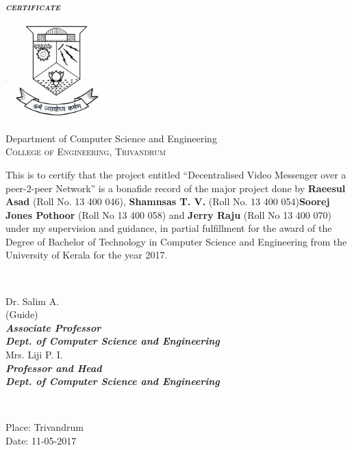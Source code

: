 \documentclass[a4paper,11pt]{article}
\begin{document}
	\begin{titlepage}
		\begin{centering}
			\textbf{\textit{\LARGE\textsc{{certificate}}}}\\
			\includegraphics[width=4cm]{images/logo.jpg}\\
                        Department of Computer Science and Engineering\\
		\textsc{College of Engineering, Trivandrum}\\[1.0cm]

		\end{centering}

		\large{This is to certify that the project entitled ``Decentralised Video Messenger over a peer-2-peer Network'' is a bonafide record of the major project done by \textbf{Raeesul Asad} (Roll No. 13 400 046), \textbf{Shamnsas T. V.} (Roll No. 13 400 054)\textbf{Soorej Jones Pothoor} (Roll No 13 400 058) and \textbf{Jerry Raju} (Roll No 13 400 070) under my supervision and guidance, in partial fulfillment for the award of the Degree of Bachelor of Technology in Computer Science and Engineering from the University of Kerala for the year 2017.}\\[1.5cm]

		\begin{minipage}{0.4\textwidth}
		\begin{flushleft}
		\end{flushleft}
		\end{minipage}
		~
		\begin{minipage}{0.6\textwidth}
		\begin{centering} \large
		\large{Dr. Salim A.}\\
		\small{(Guide)}\\
		\small{\textit{\textbf{Associate Professor}}}\\
		\small{\textit{\textbf{Dept. of Computer Science and Engineering}}}\\[1.5cm]

		\large{Mrs. Liji P. I.}\\
		\small{\textit{\textbf{Professor and Head}}}\\
		\small{\textit{\textbf{Dept. of Computer Science and Engineering}}}\\
		\end{centering}
		\end{minipage}\\[1.0cm]

		\begin{flushleft}
		Place: Trivandrum\\
		Date:  11-05-2017\\
		\end{flushleft}
		\vfill %
	\end{titlepage}
\end{document}
